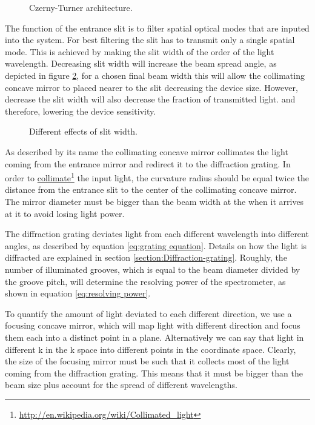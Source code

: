 \documentclass[12pt,twoside,english]{book}
\renewcommand{\~}{\perispomeni}%
\numberwithin{equation}{section}
\numberwithin{figure}{section}
\newcommand\fnurl[2]{%
 \href{#2}{#1}\footnote{\url{#2}}%
}
\begin{document}
%
\begin{figure}[h]
\centering
\caption{Czerny-Turner architecture.}
\label{fig:Czerny-Turner-architecture}
\end{figure}

The function of the entrance slit is to filter spatial optical modes that are inputed into the system. For best filtering the slit has to transmit only a single spatial mode. This is achieved by making the slit width of the order of the light wavelength. Decreasing slit width will increase the beam spread angle, as depicted in figure \ref{fig:different slits}, for a chosen final beam width this will allow the collimating concave mirror to placed nearer to the slit decreasing the device size. However, decrease the slit width will also decrease the fraction of transmitted light. and therefore, lowering the device sensitivity.

%
\begin{figure}[h]
\centering

\caption{Different effects of slit width.}
\label{fig:different slits}
\end{figure}

As described by its name the collimating concave mirror collimates the light coming from the entrance mirror and redirect it to the diffraction grating. In order to \fnurl{collimate}{http://en.wikipedia.org/wiki/Collimated_light} the input light, the curvature radius should be equal twice the distance from the entrance slit to the center of the collimating concave mirror. The mirror diameter must be bigger than the beam width at the when it arrives at it to avoid losing light power.

The diffraction grating deviates light from each different wavelength into different angles, as described by equation \ref{eq:grating equation}. Details on how the light is diffracted are explained in section \ref{section:Diffraction-grating}. Roughly, the number of illuminated grooves, which is equal to the beam diameter divided by the groove pitch, will determine the resolving power of the spectrometer, as shown in equation \ref{eq:resolving power}.

To quantify the amount of light deviated to each different direction, we use a focusing concave mirror, which will map light with different direction and focus them each into a distinct point in a plane. Alternatively we can say that light in different k in the k space into different points in the coordinate space. Clearly, the size of the focusing mirror must be such that it collects most of the light coming from the diffraction grating. This means that it must be bigger than the beam size plus account for the spread of different wavelengths.
\end{document}
